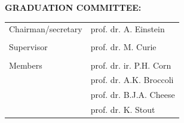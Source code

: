 \begin{titlepage}
   
    \clearpage
    \thispagestyle{empty}
    \raggedright
    \normalsize
    \textbf{GRADUATION COMMITTEE:}\\[2\baselineskip]
    \begin{table}[hb]
    \begin{tabular}{ll}
    Chairman/secretary  & prof. dr. A. Einstein\\\\    %
    Supervisor          & prof. dr. M. Curie\\\\        %
    Members             & prof. dr. ir. P.H. Corn\\                                                                    & prof. dr. A.K. Broccoli \\
                        & prof. dr. B.J.A. Cheese \\
                        & prof. dr. K. Stout 
                     

    \end{tabular}
    \end{table}


    
    
    
    
    
    
    
\end{titlepage}